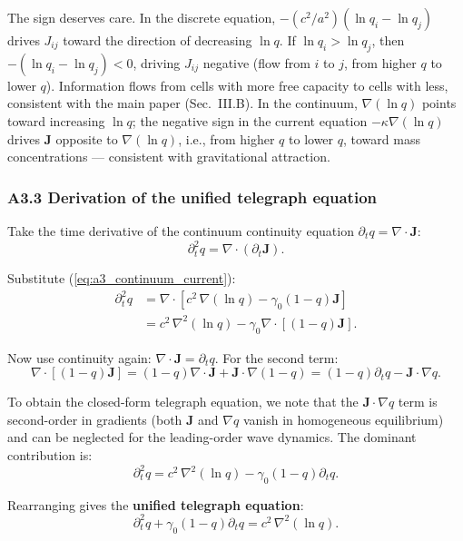 \documentclass[reprint]{revtex4-2}
\begin{document}
The sign deserves care. In the discrete equation, $-(c^2/a^2)(\ln q_i - \ln q_j)$ drives $J_{ij}$ toward the direction of decreasing $\ln q$. If $\ln q_i > \ln q_j$, then $-(\ln q_i-\ln q_j) < 0$, driving $J_{ij}$ negative (flow from $i$ to $j$, from higher $q$ to lower $q$). Information flows from cells with more free capacity to cells with less, consistent with the main paper (Sec.~III.B). In the continuum, $\nabla(\ln q)$ points toward increasing $\ln q$; the negative sign in the current equation $-\kappa\nabla(\ln q)$ drives $\mathbf{J}$ opposite to $\nabla(\ln q)$, i.e., from higher $q$ to lower $q$, toward mass concentrations --- consistent with gravitational attraction.

\subsubsection{A3.3 Derivation of the unified telegraph equation}

Take the time derivative of the continuum continuity equation $\partial_t q = \nabla\cdot\mathbf{J}$:
\begin{equation}
\partial_t^2 q = \nabla\cdot(\partial_t\mathbf{J}).
\end{equation}

Substitute (\ref{eq:a3_continuum_current}):
\begin{align}
\partial_t^2 q &= \nabla\cdot\left[c^2\,\nabla(\ln q) - \gamma_0(1-q)\mathbf{J}\right] \\
&= c^2\,\nabla^2(\ln q) - \gamma_0\nabla\cdot[(1-q)\mathbf{J}].
\end{align}

Now use continuity again: $\nabla\cdot\mathbf{J} = \partial_t q$. For the second term:
\begin{equation}
\nabla\cdot[(1-q)\mathbf{J}] = (1-q)\nabla\cdot\mathbf{J} + \mathbf{J}\cdot\nabla(1-q) = (1-q)\partial_t q - \mathbf{J}\cdot\nabla q.
\end{equation}

To obtain the closed-form telegraph equation, we note that the $\mathbf{J}\cdot\nabla q$ term is second-order in gradients (both $\mathbf{J}$ and $\nabla q$ vanish in homogeneous equilibrium) and can be neglected for the leading-order wave dynamics. The dominant contribution is:
\begin{equation}
\partial_t^2 q = c^2\,\nabla^2(\ln q) - \gamma_0(1-q)\partial_t q.
\end{equation}

Rearranging gives the \textbf{unified telegraph equation}:
\begin{equation}
\boxed{\partial_t^2 q + \gamma_0(1-q)\partial_t q = c^2\,\nabla^2(\ln q)}.
\label{eq:a3_telegraph}
\end{equation}
\end{document}
